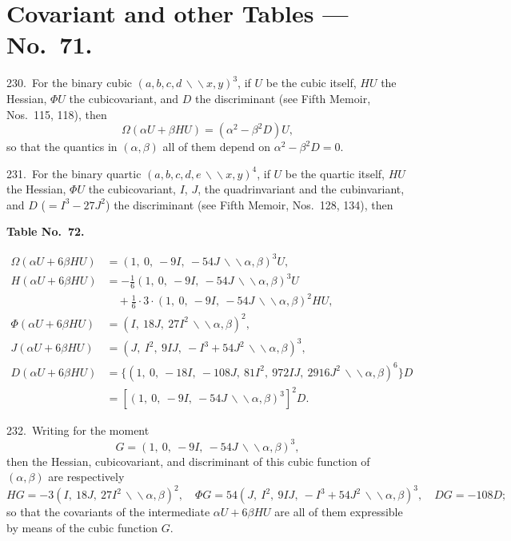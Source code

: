 \documentclass[11pt,a4paper]{book}
\begin{document}
\smallskip

\section*{Covariant and other Tables --- No.~71.}

230.\ For the binary cubic $(a,b,c,d\,\backslash\!\!\backslash x,y)^3$, if $U$ be the cubic itself, $HU$ the Hessian, $\Phi U$ the cubicovariant, and $D$ the discriminant (see Fifth Memoir, Nos.~115, 118), then
\[
\Omega(\alpha U+\beta HU) = (\alpha^2-\beta^2 D)U,
\]
so that the quantics in $(\alpha,\beta)$ all of them depend on $\alpha^2-\beta^2 D=0$.

231.\ For the binary quartic $(a,b,c,d,e\,\backslash\!\!\backslash x,y)^4$, if $U$ be the quartic itself, $HU$ the Hessian, $\Phi U$ the cubicovariant, $I$, $J$, the quadrinvariant and the cubinvariant, and $D$ ($=I^3-27J^2$) the discriminant (see Fifth Memoir, Nos.~128, 134), then

\begin{center}
\textbf{Table No.~72.}
\end{center}
\begin{align*}
\Omega(\alpha U+6\beta HU) &= (1,\ 0,\ -9I,\ -54J\,\backslash\!\!\backslash\alpha,\beta)^3 U,\\
H(\alpha U+6\beta HU) &= -\tfrac{1}{6}(1,\ 0,\ -9I,\ -54J\,\backslash\!\!\backslash\alpha,\beta)^3 U\\
&\quad + \tfrac{1}{6}\cdot 3\cdot(1,\ 0,\ -9I,\ -54J\,\backslash\!\!\backslash\alpha,\beta)^2 HU,\\
\Phi(\alpha U+6\beta HU) &= (I,\ 18J,\ 27I^2\,\backslash\!\!\backslash\alpha,\beta)^2,\\
J(\alpha U+6\beta HU) &= (J,\ I^2,\ 9IJ,\ -I^3+54J^2\,\backslash\!\!\backslash\alpha,\beta)^3,\\
D(\alpha U+6\beta HU) &= \{(1,\ 0,\ -18I,\ -108J,\ 81I^2,\ 972IJ,\ 2916J^2\,\backslash\!\!\backslash\alpha,\beta)^6\}D\\
&= [(1,\ 0,\ -9I,\ -54J\,\backslash\!\!\backslash\alpha,\beta)^3]^2 D.
\end{align*}

232.\ Writing for the moment
\[
G = (1,\ 0,\ -9I,\ -54J\,\backslash\!\!\backslash\alpha,\beta)^3,
\]
then the Hessian, cubicovariant, and discriminant of this cubic function of $(\alpha,\beta)$ are respectively
\[
HG = -3(I,\ 18J,\ 27I^2\,\backslash\!\!\backslash\alpha,\beta)^2,\quad \Phi G = 54(J,\ I^2,\ 9IJ,\ -I^3+54J^2\,\backslash\!\!\backslash\alpha,\beta)^3,\quad DG = -108D;
\]
so that the covariants of the intermediate $\alpha U+6\beta HU$ are all of them expressible by means of the cubic function $G$.
\end{document}
